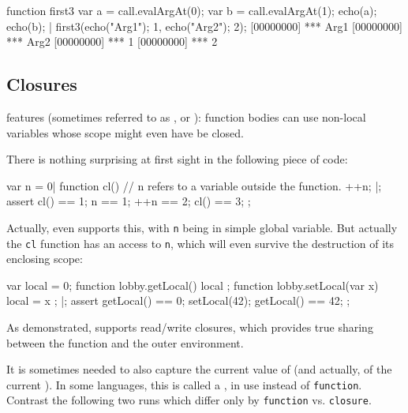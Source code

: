 \begin{urbiscript}
function first3
{
  var a = call.evalArgAt(0);
  var b = call.evalArgAt(1);
  echo(a); echo(b);
}|
first3({echo("Arg1"); 1},
       {echo("Arg2"); 2});
[00000000] *** Arg1
[00000000] *** Arg2
[00000000] *** 1
[00000000] *** 2
\end{urbiscript}

\subsection{Closures}
\label{sec:lang:closure}

\us features  (sometimes referred to as , or ): function bodies can use non-local
variables whose scope might even have be closed.

There is nothing surprising at first sight in the following piece of code:
\begin{urbiscript}
var n = 0|
function cl()
{
  // n refers to a variable outside the function.
  ++n;
}|;
assert
{
  cl() == 1;
     n == 1;
   ++n == 2;
  cl() == 3;
};
\end{urbiscript}

\noindent
Actually, even \langC supports this, with \lstinline{n} being in simple global
variable.  But actually the \lstinline{cl} function has  an
access to \lstinline{n}, which will even survive the destruction of its
enclosing scope:

\begin{urbiscript}
{
  var local = 0;
  function lobby.getLocal() { local };
  function lobby.setLocal(var x) { local = x };
}|;
assert
{
  getLocal() == 0;
  setLocal(42);
  getLocal() == 42;
};
\end{urbiscript}

As demonstrated, \us supports read/write closures, which provides true
sharing between the function and the outer environment.


It is sometimes needed to also capture the current value of \this (and
actually, of the current ).  In some languages, this is
called a , in \us use  instead of
\lstinline{function}.  Contrast the following two runs which differ only by
\lstinline{function} vs. \lstinline{closure}.

